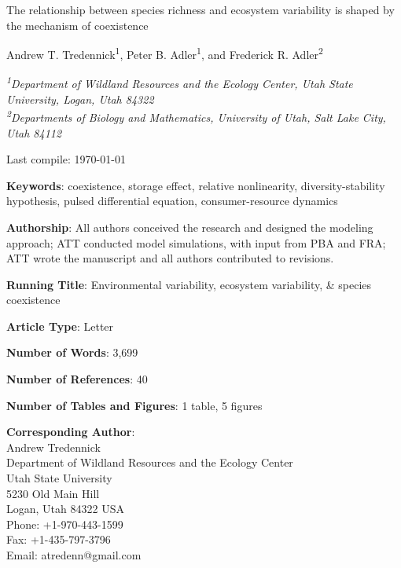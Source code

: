 \documentclass[12pt,]{article}
\title{}
\author{}
\date{}
\begin{document}
\renewcommand\linenumberfont{\normalfont\tiny\sffamily\color{gray}}

 \newcommand{\new}{\textcolor{blue}}

\begin{singlespace}

\begin{centering}

\Large{The relationship between species richness and ecosystem variability is shaped by the mechanism of coexistence}

\bigskip{} \bigskip{}

\renewcommand*{\thefootnote}{\fnsymbol{footnote}}

\normalsize{Andrew T. Tredennick\textsuperscript{1}, Peter B. Adler\textsuperscript{1}, and Frederick R. Adler\textsuperscript{2}}

\bigskip{}

\textit{\small{\textsuperscript{1}Department of Wildland Resources and the Ecology Center, Utah State University, Logan, Utah 84322}} \\
\textit{\small{\textsuperscript{2}Departments of Biology and Mathematics, University of Utah, Salt Lake City, Utah 84112}} 

\end{centering}

\vspace{3em}

Last compile: \today

\noindent \textbf{Keywords}: coexistence, storage effect, relative nonlinearity, diversity-stability hypothesis, pulsed differential equation, consumer-resource dynamics

\noindent \textbf{Authorship}: All authors conceived the research and designed the modeling approach; ATT conducted model simulations, with input from PBA and FRA; ATT wrote the manuscript and all authors contributed to revisions.

\noindent \textbf{Running Title}: Environmental variability, ecosystem variability, \& species coexistence

\noindent \textbf{Article Type}: Letter

\noindent \textbf{Number of Words}: 3,699

\noindent \textbf{Number of References}: 40

\noindent \textbf{Number of Tables and Figures}: 1 table, 5 figures

\noindent \textbf{Corresponding Author}:  \\
\phantom{222}Andrew Tredennick  \\
\phantom{222}Department of Wildland Resources and the Ecology Center  \\
\phantom{222}Utah State University  \\
\phantom{222}5230 Old Main Hill  \\
\phantom{222}Logan, Utah 84322 USA  \\
\phantom{222}Phone: +1-970-443-1599  \\
\phantom{222}Fax: +1-435-797-3796  \\
\phantom{222}Email: atredenn@gmail.com

\end{singlespace}
\end{document}
